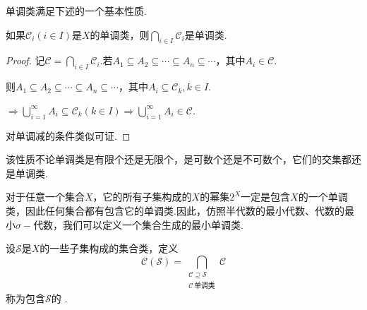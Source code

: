 单调类满足下述的一个基本性质.
\begin{property}[单调类]
    如果$\mathcal{C}_i(i\in I)$是$X$的单调类，则$\bigcap_{i\in I}{\mathcal{C}_i}$是单调类.
\end{property}
\begin{proof}
    记$\mathcal{C}=\bigcap_{i\in I}{\mathcal{C}_i}$.若$A_1\subseteq A_2\subseteq\cdots \subseteq A_n\subseteq\cdots$，其中$A_i\in\mathcal{C}$.\par
    则$A_1\subseteq A_2\subseteq\cdots\subseteq A_n\subseteq\cdots$，其中$A_i\subseteq \mathcal{C}_k,k\in I$.\par
    $\Rightarrow \bigcup_{i=1}^\infty{A_i}\subseteq\mathcal{C}_k(k\in I)\Rightarrow \bigcup_{i=1}^\infty{A_i}\in\mathcal{C}$.\par
    对单调减的条件类似可证.
\end{proof}
该性质不论单调类是有限个还是无限个，是可数个还是不可数个，它们的交集都还是单调类.\par
对于任意一个集合$X$，它的所有子集构成的$X$的幂集$2^X$一定是包含$X$的一个单调类，因此任何集合都有包含它的单调类.因此，仿照半代数的最小代数、代数的最小$\sigma-\!\!$代数，我们可以定义一个集合生成的最小单调类.
\begin{definition}
    设$\mathcal{S}$是$X$的一些子集构成的集合类，定义
    \[\mathcal{C}(\mathcal{S})=\bigcap_{\substack{\mathcal{C}\supseteq\mathcal{S}\\ \mathcal{C}\,\text{单调类}}}{\mathcal{C}}\]
    称为包含$\mathcal{S}$的 .
\end{definition}

